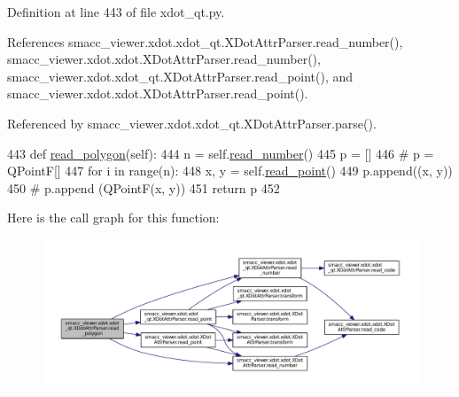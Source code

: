 Definition at line 443 of file xdot\+\_\+qt.\+py.



References smacc\+\_\+viewer.\+xdot.\+xdot\+\_\+qt.\+X\+Dot\+Attr\+Parser.\+read\+\_\+number(), smacc\+\_\+viewer.\+xdot.\+xdot.\+X\+Dot\+Attr\+Parser.\+read\+\_\+number(), smacc\+\_\+viewer.\+xdot.\+xdot\+\_\+qt.\+X\+Dot\+Attr\+Parser.\+read\+\_\+point(), and smacc\+\_\+viewer.\+xdot.\+xdot.\+X\+Dot\+Attr\+Parser.\+read\+\_\+point().



Referenced by smacc\+\_\+viewer.\+xdot.\+xdot\+\_\+qt.\+X\+Dot\+Attr\+Parser.\+parse().


\begin{DoxyCode}
443     \textcolor{keyword}{def }\hyperlink{classsmacc__viewer_1_1xdot_1_1xdot__qt_1_1XDotAttrParser_a791fe5624f47d6b459183ee32b5666a0}{read\_polygon}(self):
444         n = self.\hyperlink{classsmacc__viewer_1_1xdot_1_1xdot__qt_1_1XDotAttrParser_a6f88d7537e1f84df6d11f72177c75d21}{read\_number}()
445         p = []
446 \textcolor{comment}{#        p = QPointF[]}
447         \textcolor{keywordflow}{for} i \textcolor{keywordflow}{in} range(n):
448             x, y = self.\hyperlink{classsmacc__viewer_1_1xdot_1_1xdot__qt_1_1XDotAttrParser_acc95bb01468e72410ffbb714300dc9cc}{read\_point}()
449             p.append((x, y))
450 \textcolor{comment}{#            p.append (QPointF(x, y))}
451         \textcolor{keywordflow}{return} p
452 
\end{DoxyCode}


Here is the call graph for this function\+:
\nopagebreak
\begin{figure}[H]
\begin{center}
\leavevmode
\includegraphics[width=350pt]{classsmacc__viewer_1_1xdot_1_1xdot__qt_1_1XDotAttrParser_a791fe5624f47d6b459183ee32b5666a0_cgraph}
\end{center}
\end{figure}




